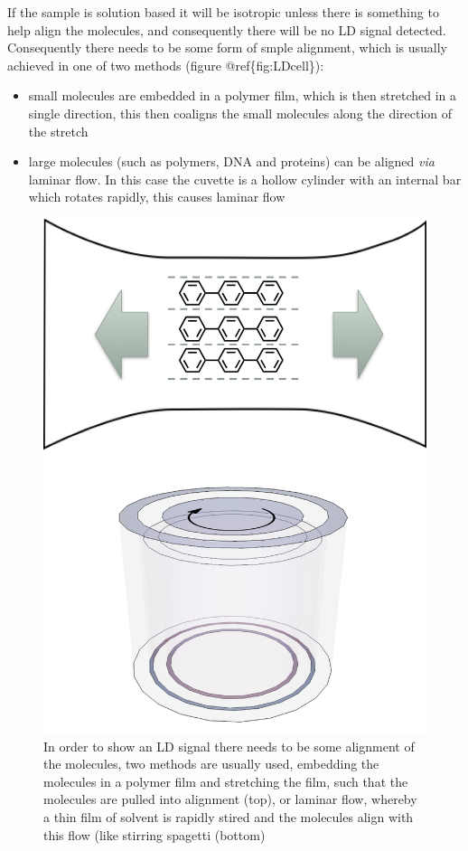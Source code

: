 \documentclass[
]{book}
\providecommand{\tightlist}{%
  \setlength{\itemsep}{0pt}\setlength{\parskip}{0pt}}
\begin{document}
If the sample is solution based it will be isotropic unless there is something to help align the molecules, and consequently there will be no LD signal detected. Consequently there needs to be some form of smple alignment, which is usually achieved in one of two methods (figure @ref\{fig:LDcell\}):

\begin{itemize}
\tightlist
\item
  small molecules are embedded in a polymer film, which is then stretched in a single direction, this then coaligns the small molecules along the direction of the stretch
\item
  large molecules (such as polymers, DNA and proteins) can be aligned \emph{via} laminar flow. In this case the cuvette is a hollow cylinder with an internal bar which rotates rapidly, this causes laminar flow
\end{itemize}

\begin{figure}

{\centering \includegraphics[width=0.6\linewidth]{images/LDcell} 

}

\caption{In order to show an LD signal there needs to be some alignment of the molecules, two methods are usually used, embedding the molecules in a polymer film and stretching the film, such that the molecules are pulled into alignment (top), or laminar flow, whereby a thin film of solvent is rapidly stired and the molecules align with this flow (like stirring spagetti (bottom)}\label{fig:LDcell}
\end{figure}
\end{document}
